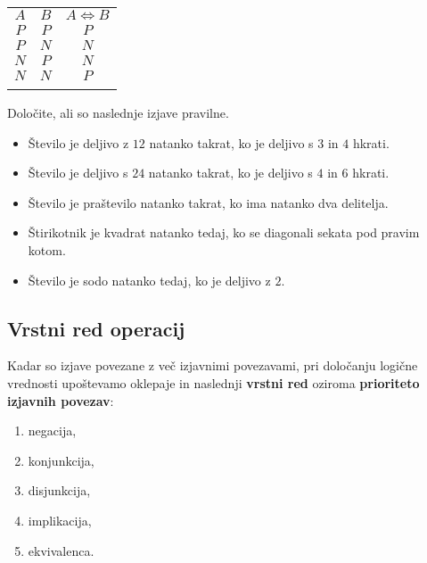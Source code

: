                     \begin{table}[H]
                        \centering
                        \begin{tabular}{||c|c|c||} 
                        \hhline{|t:===:t|}
                        \rowcolor[rgb]{0.843,0.718,0.718} $A$ & $B$ & $A\Leftrightarrow B$  \\ 
                        \hhline{|:===:|}
                        $P$ & $P$ & $P$                         \\ 
                        \hline
                        $P$ & $N$ & $N$                         \\ 
                        \hline
                        $N$ & $P$ & $N$                         \\ 
                        \hline
                        $N$ & $N$ & $P$                         \\
                        \hhline{|b:===:b|}
                        \end{tabular}
                    \end{table}


         
             \begin{naloga}
                Določite, ali so naslednje izjave pravilne.
                \begin{itemize}
                    \item Število je deljivo z $12$ natanko takrat, ko je deljivo s $3$ in $4$ hkrati.
                    \item Število je deljivo s $24$ natanko takrat, ko je deljivo s $4$ in $6$ hkrati.
                    \item Število je praštevilo natanko takrat, ko ima natanko dva delitelja.
                    \item Štirikotnik je kvadrat natanko tedaj, ko se diagonali sekata pod pravim kotom.
                    \item Število je sodo natanko tedaj, ko je deljivo z $2$.
                \end{itemize}
            \end{naloga}
         

         
             \subsection{Vrstni red operacij}
                Kadar so izjave povezane z več izjavnimi povezavami, pri določanju logične 
                vrednosti upoštevamo oklepaje in naslednji \textbf{vrstni red} oziroma
                \textbf{prioriteto izjavnih povezav}:
                \begin{enumerate}
                    \item negacija,
                    \item konjunkcija,
                    \item disjunkcija,
                    \item implikacija,
                    \item ekvivalenca.
                \end{enumerate}
             
